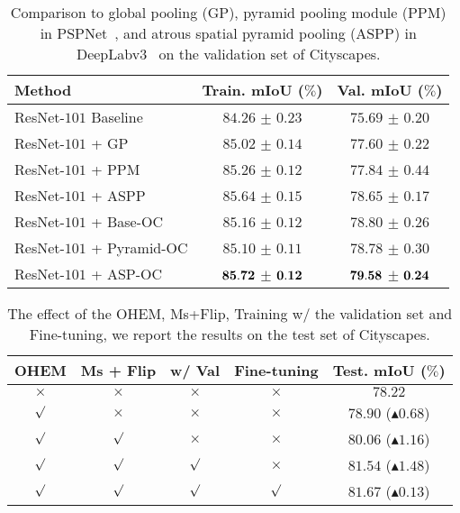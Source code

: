 \documentclass[10pt,twocolumn,letterpaper]{article}
\begin{document}
\begin{table}[htb]
\centering
\footnotesize
\caption{\small{Comparison to global pooling (GP), pyramid pooling module (PPM) in PSPNet~\cite{zhao2017pyramid},
and atrous spatial pyramid pooling (ASPP) in DeepLabv3~\cite{chen2017rethinking} on the validation set of Cityscapes.}}
\begin{tabular}{l|c|c} \hline
Method &  Train. mIoU ($\%$) & Val. mIoU ($\%$)  \\
\hline  
ResNet-$101$ Baseline  &   $84.26$ $\pm$ $0.23$  &  $75.69$ $\pm$ $0.20$  \\ \hline  
ResNet-$101$ + GP~\cite{liu2015parsenet}  &  $85.02$ $\pm$ $0.14$  &  $77.60$ $\pm$ $0.22$  \\ 
ResNet-$101$ + PPM~\cite{zhao2017pyramid}  &   $85.26$ $\pm$ $0.12$  &  $77.84$ $\pm$ $0.44$  \\ 
ResNet-$101$ + ASPP~\cite{chen2017rethinking} &  $85.64$ $\pm$ $0.15$ &  $78.65$ $\pm$ $0.17$  \\ \hline  
ResNet-$101$ + Base-OC  &   $85.16$ $\pm$ $0.12$ &  $78.80$ $\pm$ $0.26$  \\ 
ResNet-$101$ + Pyramid-OC  &  $85.10$ $\pm$ $0.11$ &  $78.78$ $\pm$ $0.30$  \\ 
ResNet-$101$ + ASP-OC &  $\bf{85.72}$ $\pm$ $\bf{0.12}$  &  $\bf{79.58}$ $\pm$ $\bf{0.24}$  \\
\hline
\end{tabular}
\label{table:ocvsppmasppgc}
\end{table}

\begin{table}[htb]
\centering
\footnotesize
\caption{\small{The effect of the OHEM, Ms+Flip, Training w/ the validation set and Fine-tuning, we report the results on the test set of Cityscapes.}}
\begin{tabular}{c|c|c|c|c} \hline
OHEM & Ms + Flip &  w/ Val & Fine-tuning & Test. mIoU ($\%$)  \\
\hline 
 $\times$ & $\times$ & $\times$ & $\times$  & $78.22$ \\
 $\surd$ & $\times$ & $\times$  & $\times$  & $78.90$ ($\blacktriangle 0.68$) \\
 $\surd$ & $\surd$ & $\times$   & $\times$  & $80.06$ ($\blacktriangle 1.16$) \\
 $\surd$ & $\surd$ & $\surd$    & $\times$  & $81.54$ ($\blacktriangle 1.48$) \\
 $\surd$ & $\surd$ & $\surd$   & $\surd$    & $81.67$ ($\blacktriangle 0.13$) \\
\hline
\end{tabular}
\label{table:ocnet_ms_ohem}
\end{table}
\end{document}
